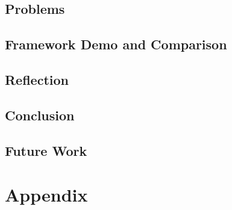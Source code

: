 \chapter{Problems}




\chapter{Framework Demo and Comparison}








\chapter{Reflection}


\chapter{Conclusion}


\chapter{Future Work}


\printbibliography

\part{Appendix}
\appendix



